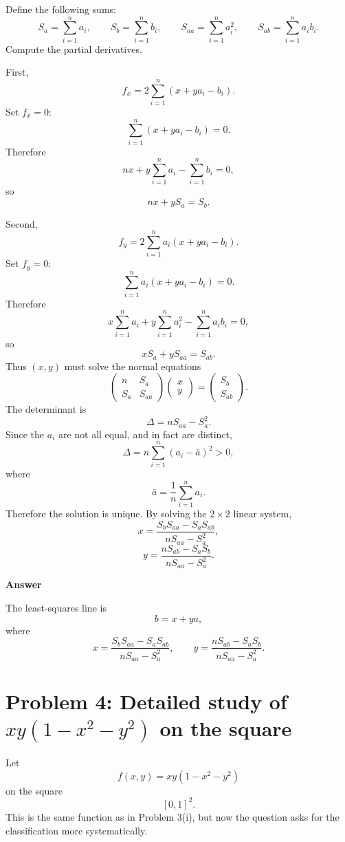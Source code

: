 \documentclass[11pt]{article}
\newenvironment{answerbox}[1]{\par\medskip\noindent\textcolor{linegreen}{\textbf{#1}}\par\smallskip}{\par\medskip}
\begin{document}
Define the following sums:
\[
S_a=\sum_{i=1}^n a_i,
\qquad
S_b=\sum_{i=1}^n b_i,
\qquad
S_{aa}=\sum_{i=1}^n a_i^2,
\qquad
S_{ab}=\sum_{i=1}^n a_i b_i.
\]
Compute the partial derivatives.

First,
\[
f_x=2\sum_{i=1}^n (x+ya_i-b_i).
\]
Set $f_x=0$:
\[
\sum_{i=1}^n (x+ya_i-b_i)=0.
\]
Therefore
\[
nx+y\sum_{i=1}^n a_i-\sum_{i=1}^n b_i=0,
\]
so
\[
nx+yS_a=S_b.
\]

Second,
\[
f_y=2\sum_{i=1}^n a_i(x+ya_i-b_i).
\]
Set $f_y=0$:
\[
\sum_{i=1}^n a_i(x+ya_i-b_i)=0.
\]
Therefore
\[
x\sum_{i=1}^n a_i+y\sum_{i=1}^n a_i^2-\sum_{i=1}^n a_i b_i=0,
\]
so
\[
xS_a+yS_{aa}=S_{ab}.
\]
Thus $(x,y)$ must solve the normal equations
\[
\begin{pmatrix}
n&S_a\\
S_a&S_{aa}
\end{pmatrix}
\begin{pmatrix}x\\y\end{pmatrix}
=
\begin{pmatrix}S_b\\S_{ab}\end{pmatrix}.
\]
The determinant is
\[
\Delta=nS_{aa}-S_a^2.
\]
Since the $a_i$ are not all equal, and in fact are distinct,
\[
\Delta=n\sum_{i=1}^n (a_i-\bar a)^2>0,
\]
where
\[
\bar a=\frac1n\sum_{i=1}^n a_i.
\]
Therefore the solution is unique. By solving the $2\times2$ linear system,
\[
x=\frac{S_bS_{aa}-S_aS_{ab}}{nS_{aa}-S_a^2},
\]
\[
y=\frac{nS_{ab}-S_aS_b}{nS_{aa}-S_a^2}.
\]

\begin{answerbox}{Answer}
The least-squares line is
\[
b=x+ya,
\]
where
\[
x=\frac{S_bS_{aa}-S_aS_{ab}}{nS_{aa}-S_a^2},
\qquad
 y=\frac{nS_{ab}-S_aS_b}{nS_{aa}-S_a^2}.
\]
\end{answerbox}

\newpage
\section{Problem 4: Detailed study of $xy(1-x^2-y^2)$ on the square}

Let
\[
f(x,y)=xy(1-x^2-y^2)
\]
on the square
\[
[0,1]^2.
\]
This is the same function as in Problem 3(i), but now the question asks for the classification more systematically.
\end{document}
